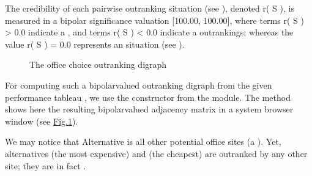 \documentclass[a4paper,12pt,english]{sphinxhowto}
\let\sphinxpxdimen\pdfpxdimen\else\newdimen\sphinxpxdimen
\begin{document}
The credibility of each pairwise outranking situation (see ), denoted r( S ), is measured in a bipolar significance valuation {[}\sphinxhyphen{}100.00, 100.00{]}, where  terms r( S ) \textgreater{} 0.0 indicate a , and  terms r( S ) \textless{} 0.0 indicate a  outrankings; whereas the  value r( S ) = 0.0 represents an  situation (see ).

\begin{figure}[H]
\centering
\capstart

\noindent\sphinxincludegraphics[width=400\sphinxpxdimen]{{officeChoiceOutranking}.png}
\caption{The office choice outranking digraph}\label{\detokenize{tutorial:officechoiceoutranking}}\end{figure}

For computing such a bipolar\sphinxhyphen{}valued outranking digraph from the given performance tableau , we use the  constructor from the  module. The  method shows here the resulting bipolar\sphinxhyphen{}valued adjacency matrix in a system browser window (see \hyperref[\detokenize{tutorial:officechoiceoutranking}]{Fig.\@ \ref{\detokenize{tutorial:officechoiceoutranking}}}).

\begin{sphinxVerbatim}[commandchars=\\\{\},numbers=left,firstnumber=1,stepnumber=1]
   
  
\end{sphinxVerbatim}

We may notice that Alternative  is  all other potential office sites (a ). Yet, alternatives  (the most expensive) and  (the cheapest) are  outranked by any other site; they are in fact  .
\end{document}
